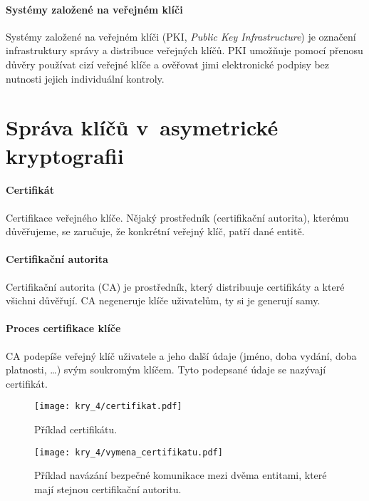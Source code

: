 \paragraph*{Systémy založené na veřejném klíči} Systémy založené na veřejném klíči (PKI, \textit{Public Key Infrastructure}) je označení infrastruktury správy a distribuce veřejných klíčů. PKI umožňuje pomocí přenosu důvěry používat cizí veřejné klíče a ověřovat jimi elektronické podpisy bez nutnosti jejich individuální kontroly.


\section{Správa klíčů v~asymetrické kryptografii}

\paragraph*{Certifikát} Certifikace veřejného klíče. Nějaký prostředník (certifikační autorita), kterému důvěřujeme, se zaručuje, že konkrétní veřejný klíč, patří dané entitě.

\paragraph*{Certifikační autorita} Certifikační autorita (CA) je prostředník, který distribuuje certifikáty a které všichni důvěřují. CA negeneruje klíče uživatelům, ty si je generují samy.

\paragraph*{Proces certifikace klíče} CA podepíše veřejný klíč uživatele a jeho další údaje (jméno, doba vydání, doba platnosti, \dots) svým soukromým klíčem. Tyto podepsané údaje se nazývají certifikát.

\begin{figure}[H]
    \centering
    \texttt{[image: kry\_4/certifikat.pdf]}
    \caption{Příklad certifikátu.}
\end{figure}

\begin{figure}[H]
    \centering
    \texttt{[image: kry\_4/vymena\_certifikatu.pdf]}
    \caption{Příklad navázání bezpečné komunikace mezi dvěma entitami, které mají stejnou certifikační autoritu.}
    \label{53_vymena_certifikatu}
\end{figure}

